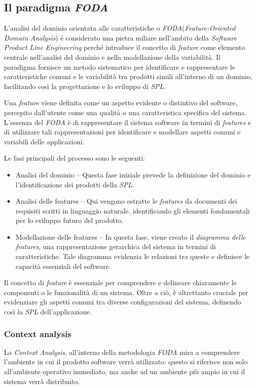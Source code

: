 \documentclass[12pt]{report}
\newcommand{\spl}{\textsl{SPL}\xspace}
\newcommand{\foda}{\textsl{FODA}\xspace}
\begin{document}
\subsection{ Il paradigma \foda}
L'analisi del dominio orientata alle caratteristiche o \foda (\textit{Feature-Oriented Domain Analysis}) \cite{kang:cohen:hess:nowak:peters}
è considerato una pietra miliare nell'ambito della \textit{Software Product Line Engineering} perché introduce il concetto di \textit{feature} come elemento centrale nell'analisi del dominio e nella modellazione della variabilità. Il paradigma fornisce un metodo sistematico per identificare e rappresentare le caratteristiche comuni e le variabilità tra prodotti simili all'interno di un dominio, facilitando così la progettazione e lo sviluppo di \spl.

Una \textit{feature} viene definita come un aspetto evidente o distintivo del software, percepito dall'utente come una qualità o una caratteristica specifica del sistema. L'essenza del \foda è di rappresentare il sistema software in termini di \textit{features} e di utilizzare tali rappresentazioni per identificare e modellare aspetti comuni e variabili delle applicazioni.

Le fasi principali del processo sono le seguenti:

\begin{itemize}
\item \textsf{Analisi del dominio} -- Questa fase iniziale prevede la definizione del dominio e l'identificazione dei prodotti della \spl.
\item \textsf{Analisi delle features} -- Qui vengono estratte le \textit{features} da documenti dei requisiti scritti in linguaggio naturale, identificando gli elementi fondamentali per lo sviluppo futuro del prodotto.
\item \textsf{Modellazione delle features} -- In questa fase, viene creato il \textit{diagramma delle features}, una rappresentazione gerarchica del sistema in termini di caratteristiche. Tale diagramma evidenzia le relazioni tra queste e definisce le capacità essenziali del software.
\end{itemize}

Il concetto di \textit{feature} è essenziale per comprendere e delineare chiaramente le componenti o le funzionalità di un sistema. Oltre a ciò, è altrettanto cruciale per evidenziare gli aspetti comuni tra diverse configurazioni del sistema, definendo così la \spl dell'applicazione.


\subsubsection{Context analysis}
La \textit{Context Analysis}, all'interno della metodologia \foda  mira a comprendere l'ambiente in cui il prodotto software verrà utilizzato: questo si riferisce non solo all'ambiente operativo immediato, ma anche ad un ambiente più ampio in cui il sistema verrà distribuito.
\end{document}
